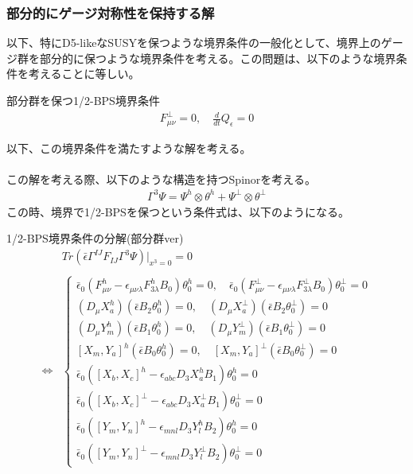 \documentclass[dvipdfmx,a4paper,10.5pt]{article}
\numberwithin{equation}{section}
\begin{document}
\subsubsection{部分的にゲージ対称性を保持する解}
以下、特にD5-likeなSUSYを保つような境界条件の一般化として、境界上のゲージ群を部分的に保つような境界条件を考える。この問題は、以下のような境界条件を考えることに等しい。
\begin{defbox}{部分群を保つ1/2-BPS境界条件}
    \begin{equation}\begin{split}
    F_{\mu\nu}^{\perp}=0,\quad\frac{d}{dt}Q_{\epsilon}=0
\end{split} \end{equation}
\end{defbox}
以下、この境界条件を満たすような解を考える。\\
\\
この解を考える際、以下のような構造を持つSpinorを考える。
\begin{equation}\begin{split}
    \Gamma^{3}\Psi=\Psi^{h}\otimes \theta^{h}+\Psi^{\perp}\otimes \theta^{\perp}
\end{split} \end{equation}
この時、境界で1/2-BPSを保つという条件式は、以下のようになる。
\begin{resultbox}{1/2-BPS境界条件の分解(部分群ver)}
    \begin{align*}
        &Tr(\bar{\epsilon}\Gamma^{IJ}F_{IJ}\Gamma^{3}\Psi)|_{x^{3}=0}=0\\
        \\
        \iff 
        &\begin{cases}
            \bar{\epsilon}_{0}(F^{h}_{\mu\nu}-\epsilon_{\mu\nu\lambda}F_{3\lambda}^{h}B_{0})\theta_{0}^{h}=0,\quad
    \bar{\epsilon}_{0}(F^{\perp}_{\mu\nu}-\epsilon_{\mu\nu\lambda}F_{3\lambda}^{\perp}B_{0})\theta_{0}^{\perp}=0\\
    (D_{\mu}X_{a}^{h})(\bar{\epsilon}B_{2}\theta_{0}^{h})=0,\quad
    (D_{\mu}X_{a}^{\perp})(\bar{\epsilon}B_{2}\theta_{0}^{\perp})=0\\
    (D_{\mu}Y_{m}^{h})(\bar{\epsilon}B_{1}\theta_{0}^{h})=0,\quad
    (D_{\mu}Y_{m}^{\perp})(\bar{\epsilon}B_{1}\theta_{0}^{\perp})=0\\
    [X_{m},Y_{a}]^{h}(\bar{\epsilon}B_{0}\theta_{0}^{h})=0,
    \quad[X_{m},Y_{a}]^{\perp}(\bar{\epsilon}B_{0}\theta_{0}^{\perp})=0\\
    \bar{\epsilon}_{0}([X_{b},X_{c}]^{h}-\epsilon_{abc}D_{3}X_{a}^{h}B_{1})\theta_{0}^{h}=0\\
    \bar{\epsilon}_{0}([X_{b},X_{c}]^{\perp}-\epsilon_{abc}D_{3}X_{a}^{\perp}B_{1})\theta_{0}^{\perp}=0\\
    \bar{\epsilon}_{0}([Y_{m},Y_{n}]^{h}-\epsilon_{mnl}D_{3}Y^{h}_{l}B_{2})\theta_{0}^{h}=0\\
    \bar{\epsilon}_{0}([Y_{m},Y_{n}]^{\perp}-\epsilon_{mnl}D_{3}Y^{\perp}_{l}B_{2})\theta_{0}^{\perp}=0
        \end{cases}
    \end{align*}
\end{resultbox}
\end{document}
